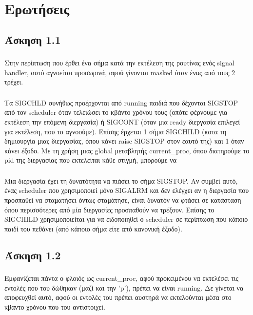 \documentclass[a4paper,10pt]{article} \usepackage{anysize}
\begin{document}

\section*{Ερωτήσεις}
\setcounter{section}{3}
\subsection{Άσκηση 1.1}
\subsubsection{}
Στην περίπτωση που έρθει ένα σήμα κατά την εκτέλεση της ρουτίνας ενός signal
handler, αυτό αγνοείται προσωρινά, αφού γίνονται masked όταν ένας από τους 2
τρέχει.
\subsubsection{}
Τα SIGCHLD συνήθως προέρχονται από running παιδιά που δέχονται SIGSTOP από τον
scheduler όταν τελειώσει το κβάντο χρόνου τους (οπότε φέρνουμε για εκτέλεση
την επόμενη διεργασία) ή SIGCONT (όταν μια ready διεργασία επιλεγεί για
εκτέλεση, που το αγνοούμε). Επίσης έρχεται 1 σήμα SIGCHILD (κατα τη δημιουργία
μιας διεργασίας, όπου κάνει raise SIGSTOP στον εαυτό της) και 1 όταν κάνει
έξοδο. Με τη χρήση μιας global μεταβλητής current\_proc, όπου διατηρούμε το pid
της διεργασίας που εκτελείται κάθε στιγμή, μπορούμε να
\subsubsection{}
Μια διεργασία έχει τη δυνατότητα να πιάσει το σήμα SIGSTΟP. Αν συμβεί αυτό,
ένας scheduler που χρησιμοποιεί μόνο SIGALRM και δεν ελέγχει αν η διεργασία
που προσπαθεί να σταματήσει όντως σταμάτησε, είναι δυνατόν να φτάσει σε
κατάσταση όπου περισσότερες από μία διεργασίες προσπαθούν να τρέξουν. Επίσης
το SIGCHILD χρησιμοποιείται για να ειδοποιηθεί ο scheduler σε περίπτωση που
κάποιο παιδί του πεθάνει (από κάποιο σήμα είτε από κανονική έξοδο).

\subsection{Άσκηση 1.2}
\subsubsection{}
Εμφανίζεται πάντα ο φλοιός ως current\_proc, αφού προκειμένου να εκτελέσει τις
εντολές που του δώθηκαν (μαζί και την 'p'), πρέπει να είναι running. Δε
γίνεται να αποφευχθεί αυτό, αφού οι εντολές του πρέπει αυστηρά να εκτελούνται
μέσα στο κβαντο χρόνου που του αντιστοιχεί.
\end{document}
